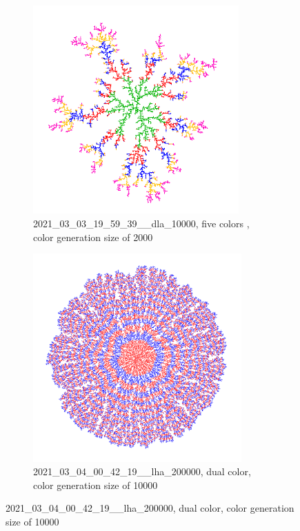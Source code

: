 \documentclass[12pt,a4paper]{scrartcl}
\newcommand{\1}{\mathbbm{1}}
\theoremstyle{definition}
\numberwithin{equation}{section}
\begin{document}
\begin{figure}[h!]
	\centering
	\begin{subfigure}[b]{.49\textwidth}
		\includegraphics[height=8cm]{images/ia/2021_03_03_19_59_39___10000__2000__7448.png}
		\caption{2021\_03\_03\_19\_59\_39\_\_dla\_10000, five colors , color generation size of 2000}
	\end{subfigure}
	\begin{subfigure}[b]{.49\textwidth}
		\includegraphics[height=8cm]{images/ia/2021_03_04_00_42_19___200000__10000__6945.png}
		\caption{2021\_03\_04\_00\_42\_19\_\_lha\_200000, dual color, color generation size of 10000}
	\end{subfigure}
\end{figure}






\newpage
\end{document}
